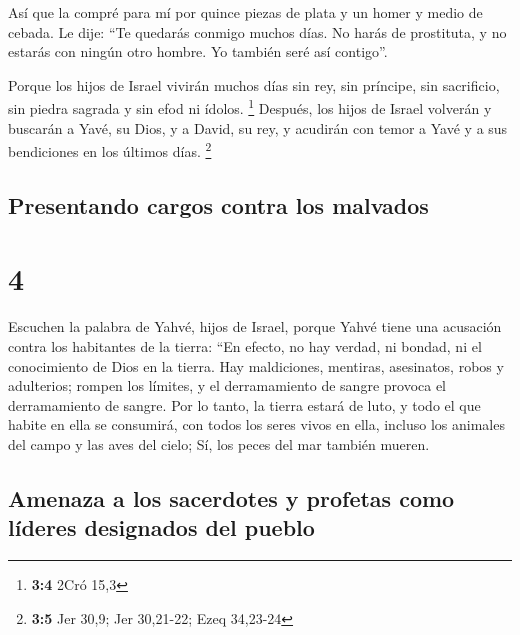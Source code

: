 Así que la compré para mí por quince piezas de plata y un
homer y medio de cebada.  Le dije: ``Te quedarás conmigo
muchos días. No harás de prostituta, y no estarás con ningún otro
hombre. Yo también seré así contigo''.

 Porque los hijos de Israel vivirán muchos días sin rey,
sin príncipe, sin sacrificio, sin piedra sagrada y sin efod ni ídolos.
\footnote{\textbf{3:4} 2Cró 15,3}  Después, los hijos de
Israel volverán y buscarán a Yavé, su Dios, y a David, su rey, y
acudirán con temor a Yavé y a sus bendiciones en los últimos días.
\footnote{\textbf{3:5} Jer 30,9; Jer 30,21-22; Ezeq 34,23-24}

\hypertarget{presentando-cargos-contra-los-malvados}{%
\subsection{Presentando cargos contra los
malvados}\label{presentando-cargos-contra-los-malvados}}

\hypertarget{section-3}{%
\section{4}\label{section-3}}

 Escuchen la palabra de Yahvé, hijos de Israel, porque
Yahvé tiene una acusación contra los habitantes de la tierra: ``En
efecto, no hay verdad, ni bondad, ni el conocimiento de Dios en la
tierra.  Hay maldiciones, mentiras, asesinatos, robos y
adulterios; rompen los límites, y el derramamiento de sangre provoca el
derramamiento de sangre.  Por lo tanto, la tierra estará
de luto, y todo el que habite en ella se consumirá, con todos los seres
vivos en ella, incluso los animales del campo y las aves del cielo; Sí,
los peces del mar también mueren.

\hypertarget{amenaza-a-los-sacerdotes-y-profetas-como-luxedderes-designados-del-pueblo}{%
\subsection{Amenaza a los sacerdotes y profetas como líderes designados
del
pueblo}\label{amenaza-a-los-sacerdotes-y-profetas-como-luxedderes-designados-del-pueblo}}

